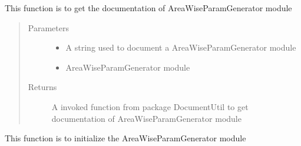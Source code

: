 \documentclass[letterpaper,10pt,english]{sphinxmanual}
\begin{document}
\begin{fulllineitems}
\begin{fulllineitems}
\end{fulllineitems}


\begin{fulllineitems}
\label{\detokenize{AgentTools.GenericModelAgent:AgentTools.GenericModelAgent.AreaWiseParamGenerator.AreaWiseParamGenerator.get_documentation}}
This function is to get the documentation of AreaWiseParamGenerator module
\begin{quote}\begin{description}
\item[{Parameters}] \leavevmode\begin{itemize}
\item {} 
 \textendash{} A string used to document a AreaWiseParamGenerator module

\item {} 
 \textendash{} AreaWiseParamGenerator module

\end{itemize}

\item[{Returns}] \leavevmode
A invoked function from package DocumentUtil to get documentation of AreaWiseParamGenerator module

\end{description}\end{quote}

\end{fulllineitems}


\end{fulllineitems}


\begin{fulllineitems}
\label{\detokenize{AgentTools.GenericModelAgent:AgentTools.GenericModelAgent.AreaWiseParamGenerator.initialize}}
This function is to initialize the AreaWiseParamGenerator module

\end{fulllineitems}
\end{document}
